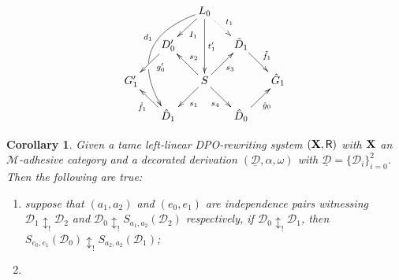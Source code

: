\documentclass[a4paper]{article}
\def\R{\mathsf{R}}
\def\X{\textbf {\textup{X}}}
\newcommand{\dder}[1]{\mathscr{#1}}
\newcommand{\der}[1]{\underline{\dder{#1}}}
\newtheorem{corollary}[theorem]{Corollary}
\theoremstyle{definition}
\begin{document}
\[\xymatrix@R=15pt@C=15pt{&&L_ 0\ar[dl]^{I_1} \ar@/_1.2cm/[dddl]_(.4){d_1}|(.63)\hole\ar[dd]^{t'_1} \ar@{.>}[dr]^{t_1}\\&D'_0 \ar[dl]^(.4){g'_0}&&\tilde{D}_1 \ar[dr]^{\tilde{f}_1}\\G'_1 && S\ar[dr]_{s_4} \ar[ur]_{s_3}\ar[dl]^{s_1} \ar[ul]_{s_2}&&\hat{G}_1\\& \hat{D}_1 \ar[ul]^{\hat{f}_1}&&\hat{D}_0 \ar[ur]_{\hat{g}_0}}\]






\newpage 
\iffalse 
\begin{corollary} Given a tame  left-linear DPO-rewriting system  $(\X,\R)$ with $\X$ an $\mathcal{M}$-adhesive category and a decorated derivation $(\der{D}, \alpha, \omega)$ with $\der{D}=\{\dder{D}_i\}_{i=0}^2$. Then the following are true: 
	\begin{enumerate}
		\item suppose that $(a_1,a_2)$ and $(e_0,e_1)$ are independence pairs witnessing  $\dder{D}_1\updownarrow_! \dder{D}_2$ and $\dder{D}_0\updownarrow_! S_{a_1,a_2}(\dder{D}_2)$ respectively, if $\dder{D}_0\updownarrow_!\dder{D}_1$, then $S_{e_0,e_1}(\dder{D}_0)\updownarrow_!S_{a_2,a_2}(\dder{D}_1)$;
		\item 
	\end{enumerate}
\end{corollary}
\end{document}
